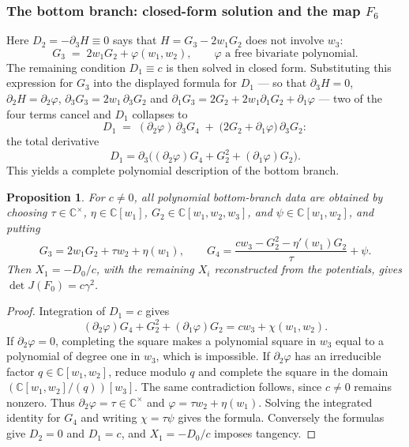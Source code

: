 \documentclass[11pt]{article}
\numberwithin{equation}{section}
\theoremstyle{plain}
\newtheorem{proposition}[theorem]{Proposition}
\theoremstyle{definition}
\theoremstyle{remark}
\newcommand{\C}{\mathbb{C}}
\begin{document}
\subsubsection{The bottom branch: closed-form solution and the map \texorpdfstring{$F_6$}{F6}}
\label{subsubsec:bottom5}

Here $D_2=-\partial_3H\equiv0$ says that $H=G_3-2w_1G_2$ does not involve
$w_3$:
\[
G_3\;=\;2w_1G_2+\varphi(w_1,w_2),
\qquad\text{$\varphi$ a free bivariate polynomial.}
\]
The remaining condition $D_1\equiv c$ is then solved in closed form.
Substituting this expression for $G_3$ into the displayed formula for $D_1$
--- so that $\partial_3H=0$, $\partial_2H=\partial_2\varphi$,
$\partial_3G_3=2w_1\,\partial_3G_2$ and
$\partial_1G_3=2G_2+2w_1\partial_1G_2+\partial_1\varphi$ --- two of the four
terms cancel and $D_1$ collapses to
\[
D_1\;=\;(\partial_2\varphi)\,\partial_3G_4
\;+\;\bigl(2G_2+\partial_1\varphi\bigr)\,\partial_3G_2 :
\]
the total derivative
\[
 D_1=\partial_3\bigl((\partial_2\varphi)G_4+G_2^2+
 (\partial_1\varphi)G_2\bigr).
\]
This yields a complete polynomial description of the bottom branch.
\begin{proposition}\label{prop:bottom-classification}
For $c\ne0$, all polynomial bottom-branch data are obtained by choosing
$\tau\in\C^\times$, $\eta\in\C[w_1]$,
$G_2\in\C[w_1,w_2,w_3]$, and $\psi\in\C[w_1,w_2]$, and putting
\[
 G_3=2w_1G_2+\tau w_2+\eta(w_1),\qquad
 G_4=\frac{cw_3-G_2^2-\eta'(w_1)G_2}{\tau}+\psi.
\]
Then $X_1=-D_0/c$, with the remaining $X_i$ reconstructed from the
potentials, gives $\det J(F_0)=c\gamma^2$.
\end{proposition}
\begin{proof}
Integration of $D_1=c$ gives
\[
 (\partial_2\varphi)G_4+G_2^2+(\partial_1\varphi)G_2
 =cw_3+\chi(w_1,w_2).
\]
If $\partial_2\varphi=0$, completing the square makes a polynomial square
in $w_3$ equal to a polynomial of degree one in $w_3$, which is impossible.
If $\partial_2\varphi$ has an irreducible factor $q\in\C[w_1,w_2]$,
reduce modulo $q$ and complete the square in the domain
$(\C[w_1,w_2]/(q))[w_3]$. The same contradiction follows, since $c\ne0$
remains nonzero. Thus $\partial_2\varphi=\tau\in\C^\times$ and
$\varphi=\tau w_2+\eta(w_1)$. Solving the integrated identity for $G_4$
and writing $\chi=\tau\psi$ gives the formula. Conversely the formulas
give $D_2=0$ and $D_1=c$, and $X_1=-D_0/c$ imposes tangency.
\end{proof}
\end{document}
